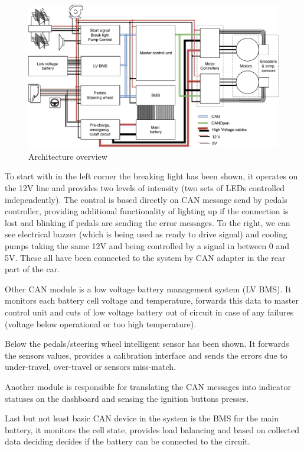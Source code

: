 \begin{figure}[h]
    \centering
    \includegraphics[width=\textwidth]{figures/Whole_with_details.pdf}
    \caption{Architecture overview}
    \label{fig:whole}
\end{figure}

To start with in the left corner the breaking light has been shown, it operates on the 12V line and provides two levels of intensity (two sets of LEDs controlled independently). The control is based directly on CAN message send by pedals controller, providing additional functionality of lighting up if the connection is lost and blinking if pedals are sending the error messages.
To the right, we can see electrical buzzer (which is being used as ready to drive signal) and cooling pumps taking the same 12V and being controlled by a signal in between 0 and 5V. These all have been connected to the system by CAN adapter in the rear part of the car.

Other CAN module is a low voltage battery management system (LV BMS). It monitors each battery cell voltage and temperature, forwards this data to master control unit and cuts of low voltage battery out of circuit in case of any failures (voltage below operational or too high temperature).

Below the pedals/steering wheel intelligent sensor has been shown. It forwards the sensors values, provides a calibration interface and sends the errors due to under-travel, over-travel or sensors miss-match.

Another module is responsible for translating the CAN messages into indicator statuses on the dashboard and sensing the ignition buttons presses. 

Last but not least basic CAN device in the system is the BMS for the main battery, it monitors the cell state, provides load balancing and based on collected data deciding decides if the battery can be connected to the circuit.

